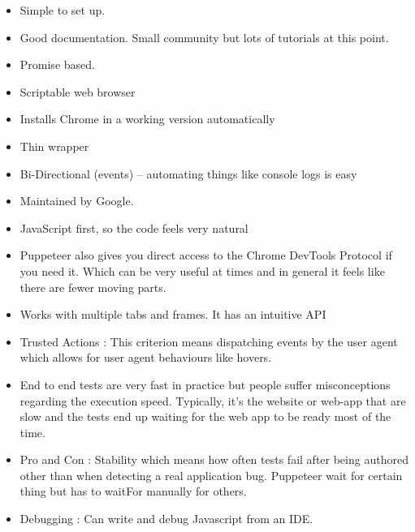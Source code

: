 \documentclass[12pt,a4paper,titlepage]{report}
\begin{document}
\begin{itemize}
  \item Simple to set up.
  \item Good documentation. Small community but lots of tutorials at this point.
  \item Promise based.
  \item Scriptable web browser
  \item Installs Chrome in a working version automatically
  \item Thin wrapper
  \item Bi-Directional (events) – automating things like console logs is easy
  \item Maintained by Google.
  \item JavaScript first, so the code feels very natural
  \item Puppeteer also gives you direct access to the Chrome DevTools Protocol if you need it. Which can be very useful at times and in general it feels like there are fewer moving parts.
  \item Works with multiple tabs and frames. It has an intuitive API
  \item Trusted Actions : This criterion means dispatching events by the user agent which allows for user agent behaviours like hovers.
  \item End to end tests are very fast in practice but people suffer misconceptions regarding the execution speed. Typically, it’s the website or web-app that are slow and the tests end up waiting for the web app to be ready most of the time.
  \item Pro and Con : Stability which means how often tests fail after being authored other than when detecting a real application bug. Puppeteer wait for certain thing but has to waitFor manually for others.
  \item Debugging : Can write and debug Javascript from an IDE.
\end{itemize}
\end{document}
